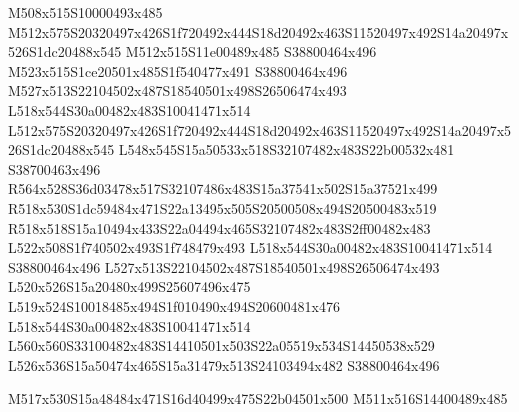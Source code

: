 \documentclass{article}
\begin{document}
\begin{multicols}{2}





M508x515S10000493x485 M512x575S20320497x426S1f720492x444S18d20492x463S11520497x492S14a20497x526S1dc20488x545 M512x515S11e00489x485 S38800464x496 M523x515S1ce20501x485S1f540477x491 S38800464x496 M527x513S22104502x487S18540501x498S26506474x493 L518x544S30a00482x483S10041471x514 L512x575S20320497x426S1f720492x444S18d20492x463S11520497x492S14a20497x526S1dc20488x545 L548x545S15a50533x518S32107482x483S22b00532x481 S38700463x496 R564x528S36d03478x517S32107486x483S15a37541x502S15a37521x499 R518x530S1dc59484x471S22a13495x505S20500508x494S20500483x519 R518x518S15a10494x433S22a04494x465S32107482x483S2ff00482x483 L522x508S1f740502x493S1f748479x493 L518x544S30a00482x483S10041471x514 S38800464x496 L527x513S22104502x487S18540501x498S26506474x493 L520x526S15a20480x499S25607496x475 L519x524S10018485x494S1f010490x494S20600481x476 L518x544S30a00482x483S10041471x514 L560x560S33100482x483S14410501x503S22a05519x534S14450538x529 L526x536S15a50474x465S15a31479x513S24103494x482 S38800464x496



\begin{center}
M517x530S15a48484x471S16d40499x475S22b04501x500 M511x516S14400489x485 
\end{center}



\end{multicols}
\end{document}

